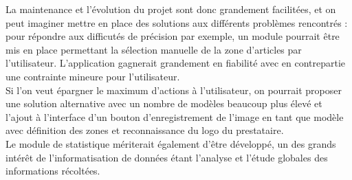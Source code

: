 La maintenance et l'évolution du projet sont donc grandement facilitées, et on peut imaginer mettre en place des solutions aux différents problèmes rencontrés : pour répondre aux difficutés de précision par exemple, un module pourrait être mis en place permettant la sélection manuelle de la zone d'articles par l'utilisateur. L'application gagnerait grandement en fiabilité avec en contrepartie une contrainte mineure pour l'utilisateur.\\
Si l'on veut épargner le maximum d'actions à l'utilisateur, on pourrait proposer une solution alternative avec un nombre de modèles beaucoup plus élevé et l'ajout à l'interface d'un bouton d'enregistrement de l'image en tant que modèle avec définition des zones et reconnaissance du logo du prestataire.\\

Le module de statistique mériterait également d'être développé, un des grands intérêt de l'informatisation de données étant l'analyse et l'étude globales des informations récoltées.